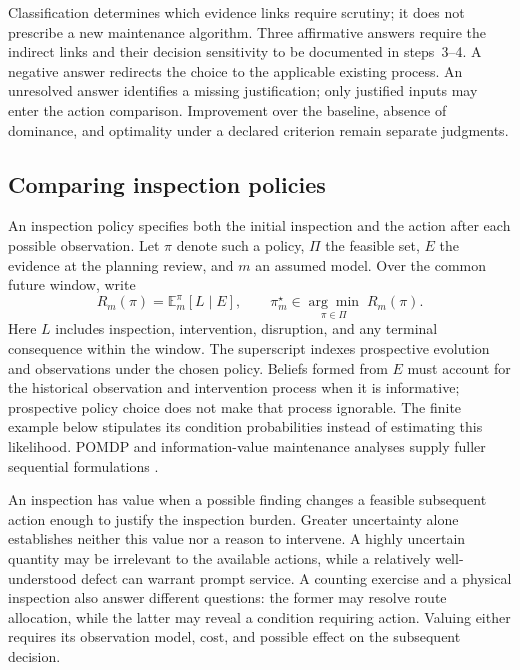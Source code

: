 \documentclass[symmetry,article,submit,pdftex,oneauthor]{Definitions/mdpi}
\begin{document}
Classification determines which evidence links require scrutiny; it does not prescribe a new maintenance algorithm. Three affirmative answers require the indirect links and their decision sensitivity to be documented in steps~3--4. A negative answer redirects the choice to the applicable existing process. An unresolved answer identifies a missing justification; only justified inputs may enter the action comparison. Improvement over the baseline, absence of dominance, and optimality under a declared criterion remain separate judgments.

\subsection{Comparing inspection policies}

An inspection policy specifies both the initial inspection and the action after each possible observation. Let $\pi$ denote such a policy, $\Pi$ the feasible set, $E$ the evidence at the planning review, and $m$ an assumed model. Over the common future window, write
\begin{equation}
R_m(\pi)=\mathbb{E}^{\pi}_m[L\mid E],
\qquad \pi_m^\star\in\underset{\pi\in\Pi}{\arg\min}\;R_m(\pi).
\label{eq:decision}
\end{equation}
Here $L$ includes inspection, intervention, disruption, and any terminal consequence within the window. The superscript indexes prospective evolution and observations under the chosen policy. Beliefs formed from $E$ must account for the historical observation and intervention process when it is informative; prospective policy choice does not make that process ignorable. The finite example below stipulates its condition probabilities instead of estimating this likelihood. POMDP and information-value maintenance analyses supply fuller sequential formulations \citep{SrinivasanParlikad2013VoCM,MemarzadehPozzi2016VoI}.

An inspection has value when a possible finding changes a feasible subsequent action enough to justify the inspection burden. Greater uncertainty alone establishes neither this value nor a reason to intervene. A highly uncertain quantity may be irrelevant to the available actions, while a relatively well-understood defect can warrant prompt service. A counting exercise and a physical inspection also answer different questions: the former may resolve route allocation, while the latter may reveal a condition requiring action. Valuing either requires its observation model, cost, and possible effect on the subsequent decision.
\end{document}
